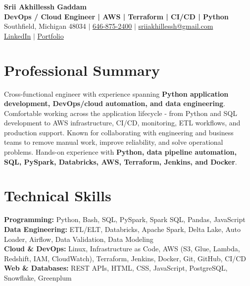 \documentclass[letterpaper,10pt]{article}
\begin{document}
\fontsize{9.35pt}{10.45pt}\selectfont

\begin{center}
    {\LARGE \textbf{Srii Akhillessh Gaddam}} \\[-1pt]
    \textbf{DevOps / Cloud Engineer | AWS | Terraform | CI/CD | Python} \\[2pt]
    Southfield, Michigan 48034 $|$
    \href{tel:6468752400}{646-875-2400} $|$
    \href{mailto:sriiakhillessh@gmail.com}{sriiakhillessh@gmail.com} \\[1pt]
    \href{https://www.linkedin.com/in/srii-akhiilessh-gaddam-b48668191/}{LinkedIn} $|$
    \href{https://sriiakhillesshg.github.io/portfolio/}{Portfolio}
\end{center}
\vspace{-8pt}

\section{Professional Summary}
\small{Cross-functional engineer with experience spanning \textbf{Python application development, DevOps/cloud automation, and data engineering}. Comfortable working across the application lifecycle - from Python and SQL development to AWS infrastructure, CI/CD, monitoring, ETL workflows, and production support. Known for collaborating with engineering and business teams to remove manual work, improve reliability, and solve operational problems. Hands-on experience with \textbf{Python, data pipeline automation, SQL, PySpark, Databricks, AWS, Terraform, Jenkins, and Docker}.}

\section{Technical Skills}
\small{
\textbf{Programming:} Python, Bash, SQL, PySpark, Spark SQL, Pandas, JavaScript \\
\textbf{Data Engineering:} ETL/ELT, Databricks, Apache Spark, Delta Lake, Auto Loader, Airflow, Data Validation, Data Modeling \\
\textbf{Cloud \& DevOps:} Linux, Infrastructure as Code, AWS (S3, Glue, Lambda, Redshift, IAM, CloudWatch), Terraform, Jenkins, Docker, Git, GitHub, CI/CD \\
\textbf{Web \& Databases:} REST APIs, HTML, CSS, JavaScript, PostgreSQL, Snowflake, Greenplum
}
\end{document}
